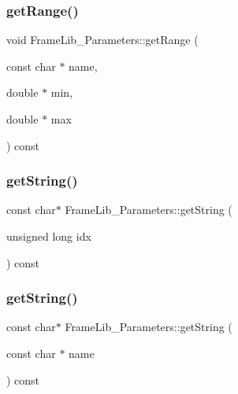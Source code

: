 \subsubsection{\texorpdfstring{get\+Range()}{getRange()}\hspace{0.1cm}{\footnotesize\ttfamily [2/2]}}
{\footnotesize\ttfamily void Frame\+Lib\+\_\+\+Parameters\+::get\+Range (\begin{DoxyParamCaption}\item[{const char $\ast$}]{name,  }\item[{double $\ast$}]{min,  }\item[{double $\ast$}]{max }\end{DoxyParamCaption}) const\hspace{0.3cm}{\ttfamily [inline]}}

\mbox{\label{class_frame_lib___parameters_a9853e712e3ee11410175d6e3028d862a}} 
\subsubsection{\texorpdfstring{get\+String()}{getString()}\hspace{0.1cm}{\footnotesize\ttfamily [1/2]}}
{\footnotesize\ttfamily const char$\ast$ Frame\+Lib\+\_\+\+Parameters\+::get\+String (\begin{DoxyParamCaption}\item[{unsigned long}]{idx }\end{DoxyParamCaption}) const\hspace{0.3cm}{\ttfamily [inline]}}

\mbox{\label{class_frame_lib___parameters_acee2bbf4822572b7b37447462f50c44b}} 
\subsubsection{\texorpdfstring{get\+String()}{getString()}\hspace{0.1cm}{\footnotesize\ttfamily [2/2]}}
{\footnotesize\ttfamily const char$\ast$ Frame\+Lib\+\_\+\+Parameters\+::get\+String (\begin{DoxyParamCaption}\item[{const char $\ast$}]{name }\end{DoxyParamCaption}) const\hspace{0.3cm}{\ttfamily [inline]}}

